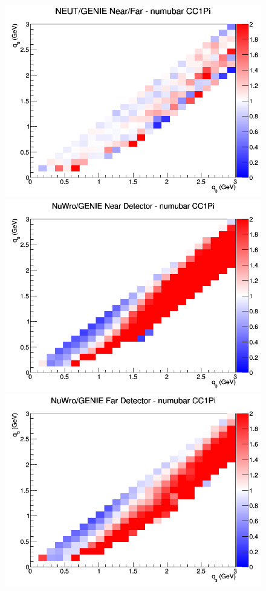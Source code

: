 \begin{figure}[h]
\endminipage
{}
\includegraphics[width=\linewidth]{q0_q3/nominal/ratios/CC1Pi_NEUT_GENIE_numubar_NF_q3_q0.png}
\endminipage
\newline
{}
\includegraphics[width=\linewidth]{q0_q3/nominal/ratios/CC1Pi_NuWro_GENIE_numubar_near_q3_q0.png}
\endminipage
{}
\includegraphics[width=\linewidth]{q0_q3/nominal/ratios/CC1Pi_NuWro_GENIE_numubar_far_q3_q0.png}

\end{figure}
